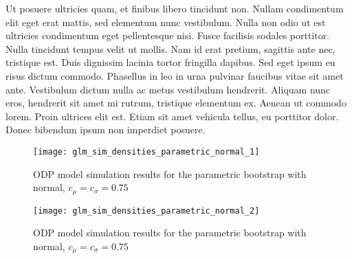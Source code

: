 \documentclass[a4paper]{book}
\begin{document}
Ut posuere ultricies quam, et finibus libero tincidunt non. Nullam condimentum elit eget erat mattis, sed elementum nunc vestibulum. Nulla non odio ut est ultricies condimentum eget pellentesque nisi. Fusce facilisis sodales porttitor. Nulla tincidunt tempus velit ut mollis. Nam id erat pretium, sagittis ante nec, tristique est. Duis dignissim lacinia tortor fringilla dapibus. Sed eget ipsum eu risus dictum commodo. Phasellus in leo in urna pulvinar faucibus vitae sit amet ante. Vestibulum dictum nulla ac metus vestibulum hendrerit. Aliquam nunc eros, hendrerit sit amet mi rutrum, tristique elementum ex. Aenean ut commodo lorem. Proin ultrices elit est. Etiam sit amet vehicula tellus, eu porttitor dolor. Donec bibendum ipsum non imperdiet posuere. 




\begin{landscape}
  \begin{figure}
    \centering
    \texttt{[image: glm\_sim\_densities\_parametric\_normal\_1]}
    \caption{ODP model simulation results for the parametric bootstrap with normal, $c_\mu = c_\sigma = 0.75$}
    \label{fig:fig:glm-sim-param-norm}
  \end{figure}
\end{landscape}

\begin{landscape}
  \begin{figure}
    \ContinuedFloat
    \captionsetup{list=off,format=cont}
    \centering
    \texttt{[image: glm\_sim\_densities\_parametric\_normal\_2]}
    \caption{ODP model simulation results for the parametric bootstrap with normal, $c_\mu = c_\sigma = 0.75$}
  \end{figure}
\end{landscape}
\end{document}
